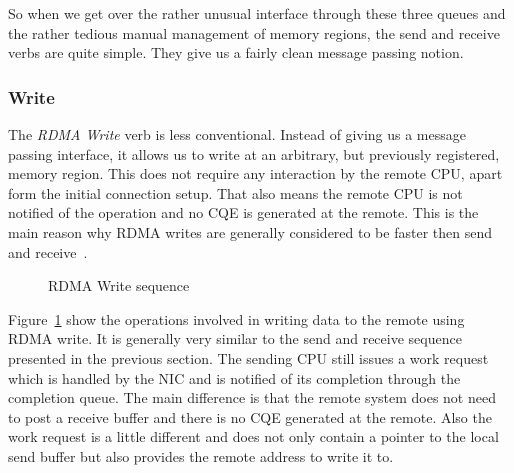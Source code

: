 So when we get over the rather unusual interface through these three queues and the rather tedious manual management of 
memory regions, the send and receive verbs are quite simple. They give us a fairly clean message passing notion.


\subsubsection{Write} \label{sec:bg:write}

The \emph{RDMA Write} verb is less conventional. Instead of giving us a message passing interface, it allows us to write at 
an arbitrary, but previously registered, memory region. This does not require any interaction by the remote CPU, apart form
the initial connection setup. 
That also means the remote CPU is not notified of the operation and no CQE is generated at the 
remote. This is the main reason why RDMA writes are generally considered to be faster then send and receive~\cite{anuj-guide}.


\begin{figure}[!ht]
\begin{center}
\end{center}
\caption{RDMA Write sequence}
\label{fig:seq-wrt}
\end{figure}

Figure~\ref{fig:seq-wrt} show the operations involved in writing data to the remote using RDMA write. It is generally very
similar to the send and receive sequence presented in the previous section. The sending CPU still issues a work request which
is handled by the NIC and is notified of its completion through the completion queue.
The main difference is that the remote system does not need to post a receive buffer and there is no CQE generated at the 
remote. Also the work request is a little different and does not only contain a pointer to the local send buffer but
also provides the remote address to write it to.

